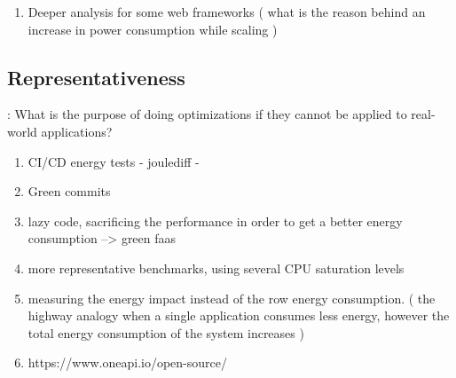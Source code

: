 \begin{enumerate}

      \item Deeper analysis for some web frameworks ( what is the reason behind an increase in power consumption while scaling )



\end{enumerate}


\subsection*{Representativeness}:
What is the purpose of doing optimizations if they cannot be applied to real-world applications?
\begin{enumerate}
      \item CI/CD energy tests  - joulediff -
      \item Green commits
      \item lazy code, sacrificing the performance in order to get a better energy consumption --> green faas
      \item more representative benchmarks, using several CPU saturation levels
      \item measuring the energy impact instead of the row energy consumption. ( the highway analogy when a single application consumes less energy, however the total energy consumption of the system increases )
      \item https://www.oneapi.io/open-source/
\end{enumerate}
\vfill \strut  %
\cleardoublepage
